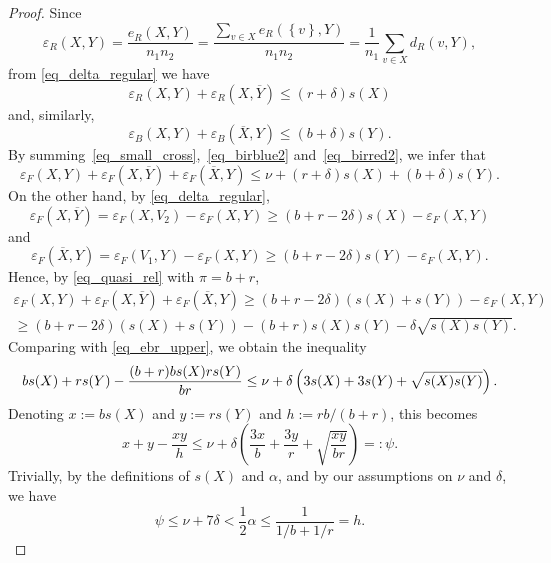 \documentclass[12pt,reqno]{amsart}
\newcommand{\eps} {\varepsilon}
\theoremstyle{definition}
\newcommand{\eb}{\eps_{B}}
\newcommand{\er}{\eps_{R}}
\newcommand{\x}{\rs{\sx}}
\newcommand{\y}{\rs{\sy}}
\newcommand{\sx}{X}
\newcommand{\scx}{\overline{X}}
\newcommand{\sy}{Y}
\newcommand{\scy}{\overline{Y}}
\newcommand{\rs}[1]{s(#1)}
\begin{document}
\begin{proof}
Since
\[
  \er(\sx,\sy) = \frac{e_R(X,Y)}{n_1n_2} = \frac{\sum_{v\in X}e_R(\left\{ v \right\}, Y)}{n_1n_2} = \frac1{n_1}\sum_{v\in X}d_R(v,Y),
\]
from \eqref{eq_delta_regular} we have
\begin{equation}
  \label{eq_birblue2}
\er(\sx,\sy) + \er(\sx,\scy) \leq (r + \delta)\x
\end{equation}
and, similarly,
\begin{equation}
  \label{eq_birred2}
	\eb(\sx,\sy) + \eb(\scx,\sy) \leq (b + \delta)\y.
\end{equation}
By summing~\eqref{eq_small_cross},~\eqref{eq_birblue2} and~\eqref{eq_birred2}, we infer that
\begin{equation}
  \label{eq_ebr_upper}
  \eps_F(\sx,\sy) + \eps_F(\sx,\scy) + \eps_F(\scx,\sy)\leq \nu + (r + \delta)\x  + (b + \delta)\y.
  \end{equation}
On the other hand, by \eqref{eq_delta_regular},
\begin{equation*}
	\eps_F(\sx,\scy) = \eps_F(\sx, V_2) - \eps_F(\sx,\sy)
		\ge (b + r - 2\delta)\x - \eps_F(\sx,\sy)
\end{equation*}
and
\begin{equation*}
	\eps_F(\scx,\sy) = \eps_F(V_1, \sy) - \eps_F(\sx,\sy)
		\ge (b + r - 2\delta)\y - \eps_F(\sx,\sy). 		
\end{equation*}
Hence, by \eqref{eq_quasi_rel} with $\pi = b + r$,
\begin{multline*}
	\eps_F(\sx,\sy) + \eps_F(\sx,\scy) + \eps_F(\scx,\sy)
		\geq (b + r - 2\delta) (\x + \y) - \eps_F(\sx, \sy) \\
	\ge (b + r  - 2\delta) (\x + \y) - (b + r)\x\y - \delta \sqrt{\x\y}.
 \end{multline*}
 Comparing with \eqref{eq_ebr_upper}, we obtain the inequality
\begin{equation*}
	b \x + r \y - \frac{(b + r)b\x r\y}{br}
	\le \nu + \delta\left(3\x + 3\y + \sqrt{\x\y}\right).\\
\end{equation*}
Denoting $x := b\x$ and $y := r\y$ and $h := rb/(b + r)$, this becomes
\begin{equation}
  \label{eq_quadratic}
	x +  y - \frac{x  y}h \le \nu + \delta \left( \frac{3x}b + \frac{3y}r +\sqrt{\frac{xy}{br}} \right) =: \psi.
\end{equation}
Trivially, by the definitions of $s(X)$ and $\alpha$, and by our assumptions on $\nu$ and $\delta$, we have
 \[
	 \psi \le \nu + 7\delta < \frac12\alpha\le \frac{1}{1/b + 1/r} = h.
\]
\end{proof}
\end{document}

